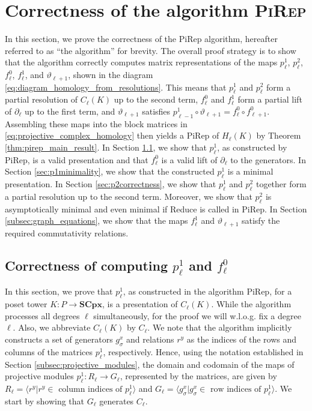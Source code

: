 \documentclass[english,a4paper,nolineno,cleveref]{socg-lipics-v2021}
\begin{document}
\section{Correctness of the algorithm \textsc{PiRep}} \label{sec:correctness}

In this section, we prove the correctness of the {\sc PiRep} algorithm, hereafter referred to as ``the algorithm'' for brevity. The overall proof strategy is to show that the algorithm correctly computes matrix representations of the maps $p_\ell^1$, $p_\ell^2$, $f_\ell^0$, $f_\ell^1$, and $\vartheta_{\ell+1}$, shown in the diagram \eqref{eq:diagram_homology_from_resolutions}. This means that $p_\ell^1$ and $p_\ell^2$ form a partial resolution of $C_\ell(K)$ up to the second term, $f_\ell^0$ and $f_\ell^1$ form a partial lift of $\partial_\ell$ up to the first term, and $\vartheta_{\ell+1}$ satisfies $p_{\ell\minus 1}^1\circ \vartheta_{\ell+1}=f_\ell^0\circ f_{\ell+1}^0$. Assembling these maps into the block matrices in \eqref{eq:projective_complex_homology} then yields a PiRep of $H_\ell(K)$ by Theorem \ref{thm:pirep_main_result}. In Section \ref{sec:p1correctness}, we show that $p^1_\ell$, as constructed by {\sc PiRep}, is a valid presentation and that $f_\ell^0$ is a valid lift of $\partial_\ell$ to the generators. In Section \ref{sec:p1minimality}, we show that the constructed $p_\ell^1$ is a minimal presentation. In Section \ref{sec:p2correctness}, we show that $p_\ell^1$ and $p_\ell^2$ together form a partial resolution up to the second term. Moreover, we show that $p_\ell^2$ is asymptotically minimal and even minimal if {\sc Reduce} is called in {\sc PiRep}. In Section \ref{subsec:graph_equations}, we show that the maps $f_\ell^1$ and $\vartheta_{\ell+1}$ satisfy the required commutativity relations. 

\subsection{Correctness of computing $p_\ell^1$ and $f_\ell^0$}
\label{sec:p1correctness}

In this section, we prove that $p^1_\ell$, as constructed in the algorithm {\sc PiRep}, for a poset tower $K\colon P\rightarrow\mathbf{SCpx}$, is a presentation of $C_\ell(K)$. While the algorithm processes all degrees $\ell$ simultaneously, for the proof we will w.l.o.g. fix a degree $\ell$. Also, we abbreviate $C_\ell(K)$ by $C_\ell$. We note that the algorithm implicitly constructs a set of generators $g_\sigma^x$ and relations $r^y$ as the indices of the rows and columns of the matrices $p_\ell^1$, respectively. Hence, using the notation established in Section \ref{subsec:projective_modules}, the domain and codomain of the maps of projective modules $p_\ell^1\colon R_\ell\rightarrow G_\ell$, represented by the matrices, are given by $R_\ell= \langle r^y\vert r^y\in \text{ column indices of }p_\ell^1 \rangle$ and $G_\ell= \langle g_{\sigma}^x\vert g_\sigma^x\in \text{ row indices of }p_\ell^1 \rangle$. We start by showing that $G_\ell$ generates $C_\ell$.  
\end{document}
